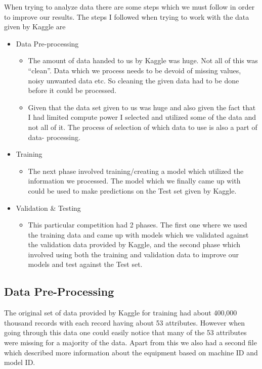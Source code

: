 \documentclass[paper=a4, fontsize=11pt]{scrartcl}	%
\numberwithin{equation}{section}		%
\numberwithin{figure}{section}			%
\numberwithin{table}{section}				%
\begin{document}
When trying to analyze data there are some steps which we must follow in order to improve our results. The steps I followed when trying to work with the data given by Kaggle are
\begin{itemize}
	\item
	Data Pre-processing
	\begin{itemize}
		\item
		The amount of data handed to us by Kaggle was huge. Not all of this was ``clean''. Data which we process needs to be devoid of missing values, noisy unwanted data etc. So cleaning the given data had to be done before it could be processed.

		\item
		Given that the data set given to us was huge and also given the fact that I had limited compute power I selected and utilized some of the data and not all of it. The process of selection of which data to use is also a part of data- processing.
	\end{itemize}

	\item
	Training
	\begin{itemize}
		\item
		The next phase involved training/creating a model which utilized the information we processed. The model which we finally came up with could be used to make predictions on the Test set given by Kaggle.
	\end{itemize}
	
	\item
	Validation \& Testing
	\begin{itemize}
		\item
		This particular competition had 2 phases. The first one where we used the training data and came up with models which we validated against the validation data provided by Kaggle, and the second phase which involved using both the training and validation data to improve our models and test against the Test set.
	\end{itemize}
\end{itemize}

\subsection{Data Pre-Processing}

The original set of data provided by Kaggle for training had about 400,000 thousand records with each record having about 53 attributes. However when going through this data one could easily notice that many of the 53 attributes were missing for a majority of the data. Apart from this we also had a second file which described more information about the equipment based on machine ID and model ID.
\end{document}

